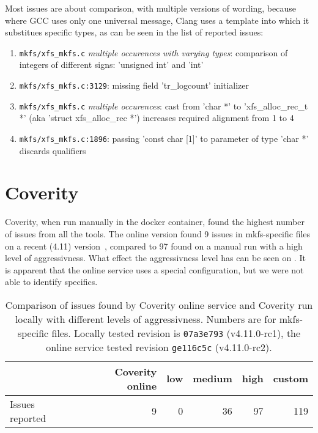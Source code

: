 Most issues are about comparison, with multiple versions of wording, because
where GCC uses only one universal message, Clang uses a template into which it
substitues specific types, as can be seen in the list of reported issues:
\begin{enumerate}
	\item {\tt mkfs/xfs\_mkfs.c} {\em multiple occurences with varying
		types}: comparison of integers of different signs: 'unsigned
		int' and 'int'
	\item {\tt mkfs/xfs\_mkfs.c:3129}: missing field 'tr\_logcount'
		initializer
	\item {\tt mkfs/xfs\_mkfs.c} {\em multiple occurences}: cast from 'char *' to
		'xfs\_alloc\_rec\_t *' (aka 'struct xfs\_alloc\_rec *')
		increases required alignment from 1 to 4
	\item {\tt mkfs/xfs\_mkfs.c:1896}: passing 'const char [1]' to
		parameter of type 'char *' discards qualifiers
\end{enumerate}


\section{Coverity}\label{chap:results:coverity}

Coverity, when run manually in the docker container, found the highest number
of issues from all the tools. The online version found 9 issues in
mkfs-specific files on a recent (4.11) version~\cite{CoverityXfsprogs},
compared to 97 found on a manual run with a high level of aggressivness. What
effect the aggressivness level has can be seen on
.  It is apparent that the online service
uses a special configuration, but we were not able to identify specifics.

\begin{table}[h]
\begin{tabular}{|l||r||r|r|r|r|}
\hline
& Coverity online & low & medium & high & custom \\
\hline
Issues reported & 9 & 0 & 36 & 97 & 119 \\
\hline
\end{tabular}
\caption{Comparison of issues found by Coverity online service and Coverity run
locally with different levels of aggressivness. Numbers are for mkfs-specific
files. Locally tested revision is {\tt 07a3e793} (v4.11.0-rc1), the online
service tested revision {\tt ge116c5c} (v4.11.0-rc2).}
\label{tab:results:coverity:levels}
\end{table}


